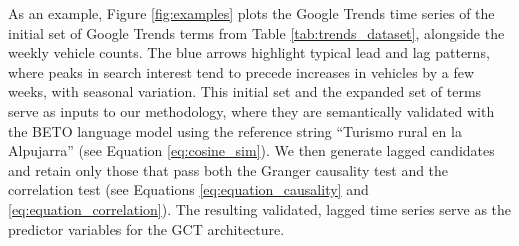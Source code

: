 \documentclass[acmsmall]{acmart}
\begin{document}
\begin{table}[ht]
\centering
\footnotesize
{}
\caption{{\color{black}Description of the Rural} Case Study dataset}
\label{tab:trends_dataset}
\end{table}




{\color{black} As an example, Figure \ref{fig:examples} plots the Google Trends time series of the initial set of Google Trends terms from Table \ref{tab:trends_dataset}, alongside the weekly vehicle counts. The blue arrows highlight typical lead and lag patterns, where peaks in search interest tend to precede increases in vehicles by a few weeks, with seasonal variation. This initial set and the expanded set of terms serve as inputs to our methodology, where they are semantically validated with the BETO language model using the reference string ``Turismo rural en la Alpujarra'' (see Equation \ref{eq:cosine_sim}). We  then generate lagged candidates and retain only those that pass both the Granger causality test and the correlation test (see Equations 
\ref{eq:equation_causality} and \ref{eq:equation_correlation}). The resulting validated, lagged time series serve as the predictor variables for the GCT {\color{blue}architecture}.
}
\end{document}
